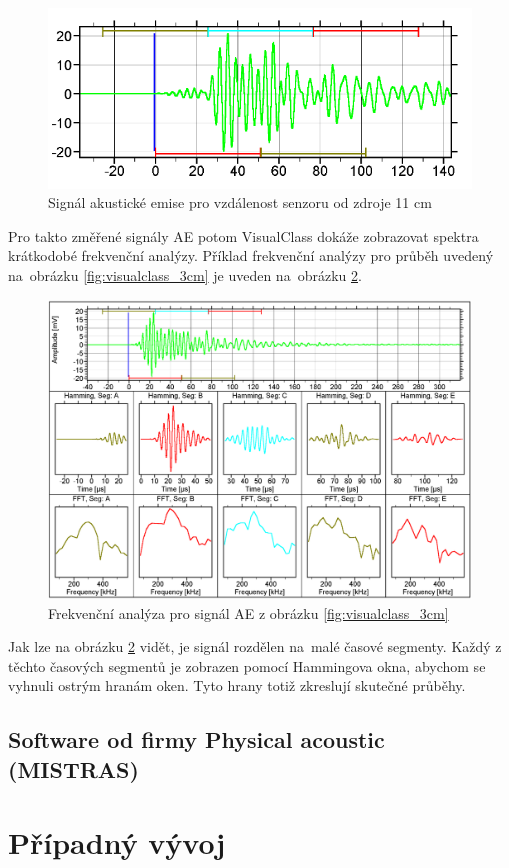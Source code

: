 \begin{figure}[!h]
    \centering
    \includegraphics[width=0.7\linewidth]{obrazky/visualclass_11cm.png}
    \caption{Signál akustické emise pro vzdálenost senzoru od zdroje 11 cm \cite{vallen_visual_class}}
    \label{fig:visualclass_11cm}
\end{figure}
Pro takto změřené signály
 AE potom VisualClass dokáže zobrazovat 
 spektra krátkodobé frekvenční analýzy. 
 Příklad frekvenční analýzy pro průběh uvedený na~obrázku \ref{fig:visualclass_3cm} je uveden na~obrázku \ref{fig:vallen_frekvencni_analyza}. 
\begin{figure}[!h]
    \centering
    \includegraphics[width=0.75\linewidth]{visual_class_spectral_analysis.png}
    \caption{Frekvenční analýza pro signál AE z obrázku \ref{fig:visualclass_3cm} \cite{vallen_visual_class}}
    \label{fig:vallen_frekvencni_analyza}
\end{figure}
Jak lze na obrázku 
\ref{fig:vallen_frekvencni_analyza} vidět, 
je signál rozdělen na~malé časové segmenty. 
Každý z těchto časových segmentů je zobrazen pomocí Hammingova okna, abychom se vyhnuli ostrým hranám oken. Tyto hrany totiž zkreslují skutečné průběhy.
\subsection{Software od firmy Physical acoustic (MISTRAS)}

\section{Případný vývoj}








